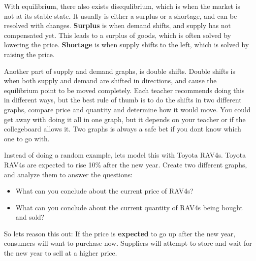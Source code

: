 \begin{example}
    With equilibrium, there also exists disequlibrium, which is when the market is not at its stable state. It usually is either a surplus or a shortage, and can be resolved with changes. 
    \textbf{Surplus} is when demand shifts, and supply has not compensated yet. This leads to a surplus of goods, which is often solved by lowering the price. 
    \textbf{Shortage} is when supply shifts to the left, which is solved by raising the price. 
\end{example}

Another part of supply and demand graphs, is double shifts. Double shifts is when both supply and demand are shifted in directions, and cause the equilibrium point to be moved completely. Each teacher recommends doing this in different ways, but the best rule of thumb is to do the shifts in two different graphs, compare price and quantity and determine how it would move. You could get away with doing it all in one graph, but it depends on your teacher or if the collegeboard allows it. Two graphs is always a safe bet if you dont know which one to go with. 

Instead of doing a random example, lets model this with Toyota RAV4s. Toyota RAV4s are expected to rise 10\% after the new year. Create two different graphs, and analyze them to answer the questions:
\begin{itemize}
    \item What can you conclude about the current price of RAV4s?
    \item What can you conclude about the current quantity of RAV4s being bought and sold?
\end{itemize}

So lets reason this out: If the price is \textbf{expected} to go up after the new year, consumers will want to purchase now. Suppliers will attempt to store and wait for the new year to sell at a higher price. 

